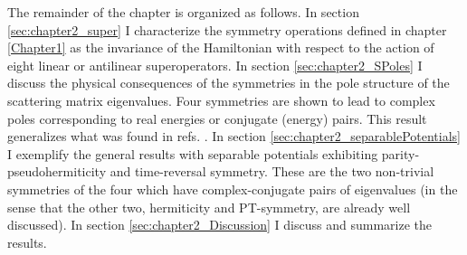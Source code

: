 The remainder of the chapter is organized as follows. In section \ref{sec:chapter2_super} I characterize the symmetry operations defined in chapter \ref{Chapter1} as the invariance of the Hamiltonian with respect to the action of eight linear or antilinear superoperators. In section \ref{sec:chapter2_SPoles} I discuss the physical consequences of the symmetries in the pole structure of the scattering matrix eigenvalues. Four symmetries are shown to lead to complex poles corresponding to real energies or conjugate (energy) pairs. This result generalizes what was found in refs. \cite{Mostafazadeh2002,Mostafazadeh2002a,Mostafazadeh2002b}. In section \ref{sec:chapter2_separablePotentials} I exemplify the general results with separable potentials exhibiting parity-pseudohermiticity and time-reversal symmetry. These are the two non-trivial symmetries of the four which have complex-conjugate pairs of eigenvalues (in the sense that the other two, hermiticity and PT-symmetry, are already well discussed). In section \ref{sec:chapter2_Discussion} I discuss and summarize the results.
%
